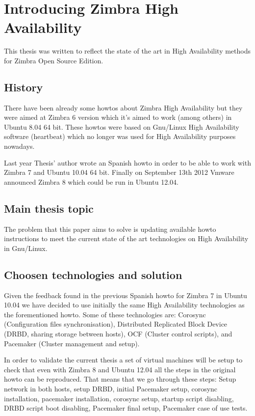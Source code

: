 

\chapter{Introducing Zimbra High Availability}
This thesis was written to reflect the state of the art in High Availability methods for Zimbra Open Source Edition.  

\section{History}
There have been already some howtos about Zimbra High Availability but they were aimed at Zimbra 6 version which it's aimed to work (among others) in Ubuntu 8.04 64 bit. These howtos were based on Gnu/Linux High Availability software (heartbeat) which no longer was used for High Availability purposes nowadays.

Last year Thesis' author wrote an Spanish howto in order to be able to work with Zimbra 7 and Ubuntu 10.04 64 bit. Finally on September 13th 2012 Vmware announced Zimbra 8 which could be run in Ubuntu 12.04.

\section {Main thesis topic}
The problem that this paper aims to solve is updating available howto instructions to meet the current state of the art technologies on High Availability in Gnu/Linux.

\section {Choosen technologies and solution}
Given the feedback found in the previous Spanish howto for Zimbra 7 in Ubuntu 10.04 we have decided to use initially the same High Availability technologies as the forementioned howto. Some of these technologies are: Corosync (Configuration files synchronisation), Distributed Replicated Block Device (DRBD, sharing storage between hosts), OCF (Cluster control scripts), and Pacemaker (Cluster management and setup).

In order to validate the current thesis a set of virtual machines will be setup to check that even with Zimbra 8 and Ubuntu 12.04 all the steps in the original howto can be reproduced. That means that we go through these steps: Setup network in both hosts, setup DRBD, initial Pacemaker setup, corosync installation, pacemaker installation, corosync setup, startup script disabling, DRBD script boot disabling, Pacemaker final setup, Pacemaker case of use tests.


